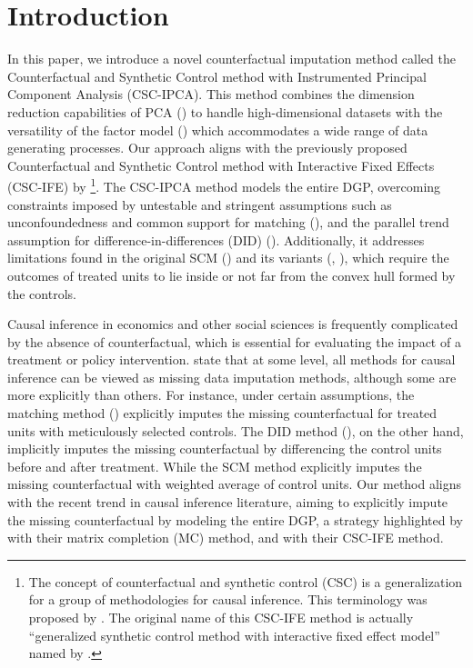 \documentclass[12pt]{article}
\begin{document}
\doublespacing

\section{Introduction} 
\label{sec:introduction}
In this paper, we introduce a novel counterfactual imputation method called the Counterfactual and Synthetic Control method with Instrumented Principal Component Analysis (CSC-IPCA). This method combines the dimension reduction capabilities of PCA (\cite{jollife2016principal}) to handle high-dimensional datasets with the versatility of the factor model (\cite{bai2003computation,bai2009panel}) which accommodates a wide range of data generating processes. Our approach aligns with the previously proposed Counterfactual and Synthetic Control method with Interactive Fixed Effects (CSC-IFE) by \cite{xu2017generalized}\footnote{The concept of counterfactual and synthetic control (CSC) is a generalization for a group of methodologies for causal inference. This terminology was proposed by \cite{chernozhukov2021exact}. The original name of this CSC-IFE method is actually ``generalized synthetic control method with interactive fixed effect model'' named by \cite{xu2017generalized}.}. The CSC-IPCA method models the entire DGP, overcoming constraints imposed by untestable and stringent assumptions such as unconfoundedness and common support for matching (\cite{rosenbaum1983central, rubin1997estimating}), and the parallel trend assumption for difference-in-differences (DID) (\cite{card1993minimum}). Additionally, it addresses limitations found in the original SCM (\cite{abadie2010synthetic}) and its variants (\cite{ben2021augmented}, \cite{arkhangelsky2021synthetic}), which require the outcomes of treated units to lie inside or not far from the convex hull formed by the controls.

Causal inference in economics and other social sciences is frequently complicated by the absence of counterfactual, which is essential for evaluating the impact of a treatment or policy intervention. \cite{imbens2015causal} state that at some level, all methods for causal inference can be viewed as missing data imputation methods, although some are more explicitly than others. For instance, under certain assumptions, the matching method (\cite{abadie2006large, abadie2011bias}) explicitly imputes the missing counterfactual for treated units with meticulously selected controls. The DID method (\cite{card1993minimum, ashenfelter1978estimating}), on the other hand, implicitly imputes the missing counterfactual by differencing the control units before and after treatment. While the SCM method explicitly imputes the missing counterfactual with weighted average of control units. Our method aligns with the recent trend in causal inference literature, aiming to explicitly impute the missing counterfactual by modeling the entire DGP, a strategy highlighted by \cite{athey2021matrix} with their matrix completion (MC) method, and \cite{xu2017generalized} with their CSC-IFE method.
\end{document}
